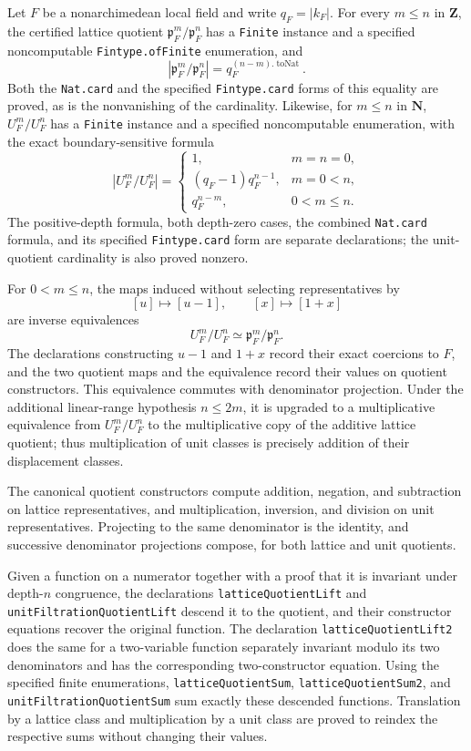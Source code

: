 \begin{definition}\label{mod:localfield-finitequotients}
Let $F$ be a nonarchimedean local field and write
$q_F=|k_F|$.  For every $m\leq n$ in $\mathbf Z$, the certified lattice
quotient $\mathfrak p_F^m/\mathfrak p_F^n$ has a
\texttt{Finite} instance and a specified noncomputable
\texttt{Fintype.ofFinite} enumeration, and
\[
 \left|\mathfrak p_F^m/\mathfrak p_F^n\right|
   =q_F^{(n-m).\operatorname{toNat}}.
\]
Both the \texttt{Nat.card} and the specified \texttt{Fintype.card} forms
of this equality are proved, as is the nonvanishing of the cardinality.
Likewise, for $m\leq n$ in $\mathbf N$,
$U_F^m/U_F^n$ has a \texttt{Finite} instance and a specified
noncomputable enumeration, with the exact boundary-sensitive formula
\[
 |U_F^m/U_F^n|=
 \begin{cases}
  1,&m=n=0,\\
  (q_F-1)q_F^{n-1},&m=0<n,\\
  q_F^{n-m},&0<m\leq n.
 \end{cases}
\]
The positive-depth formula, both depth-zero cases, the combined
\texttt{Nat.card} formula, and its specified \texttt{Fintype.card} form
are separate declarations; the unit-quotient cardinality is also proved
nonzero.

For $0<m\leq n$, the maps induced without selecting representatives by
\[
  [u]\longmapsto[u-1],\qquad [x]\longmapsto[1+x]
\]
are inverse equivalences
\[
 U_F^m/U_F^n\simeq \mathfrak p_F^m/\mathfrak p_F^n.
\]
The declarations constructing $u-1$ and $1+x$ record their exact
coercions to $F$, and the two quotient maps and the equivalence record
their values on quotient constructors.  This equivalence commutes with
denominator projection.  Under the additional linear-range
hypothesis $n\leq2m$, it is upgraded to a multiplicative equivalence
from $U_F^m/U_F^n$ to the multiplicative copy of the additive lattice
quotient; thus multiplication of unit classes is precisely addition of
their displacement classes.

The canonical quotient constructors compute addition, negation, and
subtraction on lattice representatives, and multiplication, inversion,
and division on unit representatives.  Projecting to the same denominator
is the identity, and successive denominator projections compose, for both
lattice and unit quotients.

Given a function on a numerator together with a proof that it is invariant
under depth-$n$ congruence, the declarations
\texttt{latticeQuotientLift} and \texttt{unitFiltrationQuotientLift}
descend it to the quotient, and their constructor equations recover the
original function.  The declaration
\texttt{latticeQuotientLift2} does the same for a two-variable function
separately invariant modulo its two denominators and has the corresponding
two-constructor equation.  Using the specified finite enumerations,
\texttt{latticeQuotientSum}, \texttt{latticeQuotientSum2}, and
\texttt{unitFiltrationQuotientSum} sum exactly these descended functions.
Translation by a lattice class and multiplication by a unit class are
proved to reindex the respective sums without changing their values.


\end{definition}
